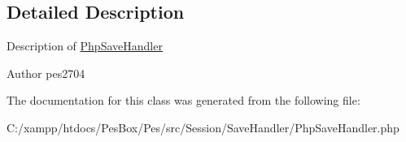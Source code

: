 \subsection{Detailed Description}
Description of \mbox{\hyperlink{class_pes_1_1_session_1_1_save_handler_1_1_php_save_handler}{Php\+Save\+Handler}}

\begin{DoxyAuthor}{Author}
pes2704 
\end{DoxyAuthor}


The documentation for this class was generated from the following file\+:\begin{DoxyCompactItemize}
\item 
C\+:/xampp/htdocs/\+Pes\+Box/\+Pes/src/\+Session/\+Save\+Handler/Php\+Save\+Handler.\+php\end{DoxyCompactItemize}
